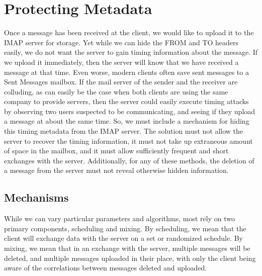 \documentclass[pageno]{jpaper}
\newcommand{\project}{IMAPSec }
\begin{document}
\section{Protecting Metadata}
Once a message has been received at the client, we would like to upload it to the IMAP server for storage. Yet while we can hide the FROM and TO headers easily, we do not want the server to gain timing information about the message. If we upload it immediately, then the server will know that we have received a message at that time. Even worse, modern clients often save sent messages to a Sent Messages mailbox. If the mail server of the sender and the receiver are colluding, as can easily be the case when both clients are using the same company to provide servers, then the server could easily execute timing attacks by observing two users suspected to be communicating, and seeing if they upload a message at about the same time. So, we must include a mechanism for hiding this timing metadata from the IMAP server. The solution must not allow the server to recover the timing information, it must not take up extraneous amount of space in the mailbox, and it must allow sufficiently frequent and short exchanges with the server. Additionally, for any of these methods, the deletion of a message from the server must not reveal otherwise hidden information.

\subsection{Mechanisms}
While we can vary particular parameters and algorithms, most rely on two primary components, scheduling and mixing. By scheduling, we mean that the client will exchange data with the server on a set or randomized schedule. By mixing, we mean that in an exchange with the server, multiple messages will be deleted, and multiple messages uploaded in their place, with only the client being aware of the correlations between messages deleted and uploaded.

\end{document}
